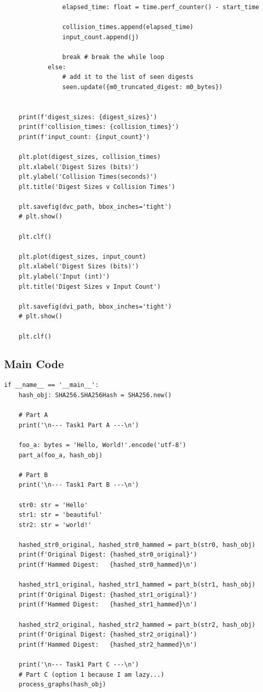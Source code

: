 \documentclass[11pt]{article}
\begin{document}
\begin{lstlisting}
                elapsed_time: float = time.perf_counter() - start_time

                collision_times.append(elapsed_time)
                input_count.append(j)

                break # break the while loop
            else:
                # add it to the list of seen digests
                seen.update({m0_truncated_digest: m0_bytes})


    print(f'digest_sizes: {digest_sizes}')
    print(f'collision_times: {collision_times}')
    print(f'input_count: {input_count}')

    plt.plot(digest_sizes, collision_times)
    plt.xlabel('Digest Sizes (bits)')
    plt.ylabel('Collision Times(seconds)')
    plt.title('Digest Sizes v Collision Times')

    plt.savefig(dvc_path, bbox_inches='tight')
    # plt.show()

    plt.clf()

    plt.plot(digest_sizes, input_count)
    plt.xlabel('Digest Sizes (bits)')
    plt.ylabel('Input (int)')
    plt.title('Digest Sizes v Input Count')

    plt.savefig(dvi_path, bbox_inches='tight')
    # plt.show()

    plt.clf()
\end{lstlisting}

\subsection*{Main Code}

\begin{lstlisting}
if __name__ == '__main__':
    hash_obj: SHA256.SHA256Hash = SHA256.new()

    # Part A
    print('\n--- Task1 Part A ---\n')

    foo_a: bytes = 'Hello, World!'.encode('utf-8')
    part_a(foo_a, hash_obj)

    # Part B 
    print('\n--- Task1 Part B ---\n')

    str0: str = 'Hello'
    str1: str = 'beautiful'
    str2: str = 'world!'

    hashed_str0_original, hashed_str0_hammed = part_b(str0, hash_obj)
    print(f'Original Digest: {hashed_str0_original}')
    print(f'Hammed Digest:   {hashed_str0_hammed}\n')

    hashed_str1_original, hashed_str1_hammed = part_b(str1, hash_obj)
    print(f'Original Digest: {hashed_str1_original}')
    print(f'Hammed Digest:   {hashed_str1_hammed}\n')

    hashed_str2_original, hashed_str2_hammed = part_b(str2, hash_obj)
    print(f'Original Digest: {hashed_str2_original}')
    print(f'Hammed Digest:   {hashed_str2_hammed}\n')

    print('\n--- Task1 Part C ---\n')
    # Part C (option 1 because I am lazy...)
    process_graphs(hash_obj)

\end{lstlisting}
\end{document}
